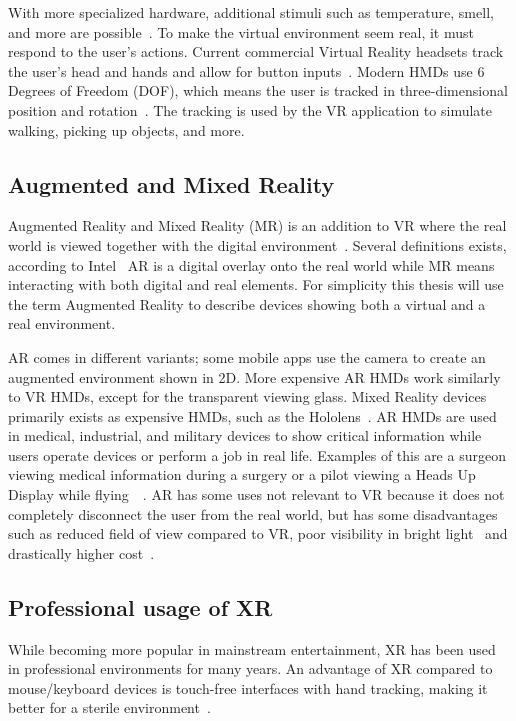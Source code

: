 \documentclass[a4paper]{report}
\begin{document}
With more specialized hardware, additional stimuli such as temperature, smell, and more are possible~\cite{noauthor_feelreal_nodate}.
To make the virtual environment seem real, it must respond to the user's actions. Current commercial Virtual Reality headsets track the user's head and hands and allow for button inputs~\cite{noauthor_oculus_nodate}. Modern HMDs use 6 Degrees of Freedom (DOF), which means the user is tracked in three-dimensional position and rotation~\cite{lang_introduction_2013}. The tracking is used by the VR application to simulate walking, picking up objects, and more.

\subsection{Augmented and Mixed Reality}
Augmented Reality and Mixed Reality (MR) is an addition to VR where the real world is viewed together with the digital environment~\cite{hackett_three-dimensional_2016}. Several definitions exists, according to Intel~\cite{intel_virtual_nodate} AR is a digital overlay onto the real world while MR means interacting with both digital and real elements.
For simplicity this thesis will use the term Augmented Reality to describe devices showing both a virtual and a real environment.

AR comes in different variants; some mobile apps use the camera to create an augmented environment shown in 2D. More expensive AR HMDs work similarly to VR HMDs, except for the transparent viewing glass. Mixed Reality devices primarily exists as expensive HMDs, such as the Hololens~\cite{hololens_microsoft_nodate}.
AR HMDs are used in medical, industrial, and military devices to show critical information while users operate devices or perform a job in real life. Examples of this are a surgeon viewing medical information during a surgery or a pilot viewing a Heads Up Display while flying~\cite{mihelj_virtual_2014}~\cite{mertz_virtual_2019}.
AR has some uses not relevant to VR because it does not completely disconnect the user from the real world, but has some disadvantages such as reduced field of view compared to VR, poor visibility in bright light~\cite{hackett_three-dimensional_2016} and drastically higher cost~\cite{medical_holodeck_medicalholodeck_nodate}.

\subsection{Professional usage of XR}
While becoming more popular in mainstream entertainment, XR has been used in professional environments for many years.
An advantage of XR compared to mouse/keyboard devices is touch-free interfaces with hand tracking, making it better for a sterile environment~\cite{andrews_extended_2019}.
\end{document}
